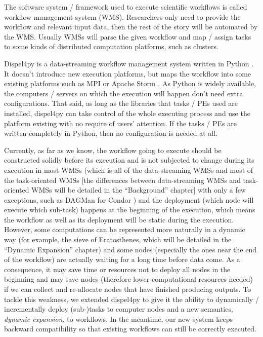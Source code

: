 The software system / framework used to execute scientific workflows is called workflow management system (WMS). Researchers only need to provide the workflow and relevant input data, then the rest of the story will be automated by the WMS. Usually WMSs will parse the given workflow and map / assign tasks to some kinds of distributed computation platforms, such as clusters.

Dispel4py is a data-streaming workflow management system written in Python \cite{doi:10.1177/1094342016649766}. It doesn't introduce new execution platforms, but maps the workflow into some existing platforms such as MPI \cite{MPI_forum} or Apache Storm \cite{apache_storm}. As Python is widely available, the computers / servers on which the execution will happen don't need extra configurations. That said, as long as the libraries that tasks / PEs used are installed, dispel4py can take control of the whole executing process and use the platform existing with no require of users' attention. If the tasks / PEs are written completely in Python, then no configuration is needed at all.

Currently, as far as we know, the workflow going to execute should be constructed solidly before its execution and is not subjected to change during its execution in most WMSs (which is all of the data-streaming WMSs and most of the task-oriented WMSs [the differences between data-streaming WMSs and task-oriented WMSs will be detailed in the ``Background'' chapter] with only a few exceptions, such as DAGMan for Condor \cite{couvares2007workflow}) and the deployment (\ie which node will execute which sub-task) happens at the beginning of the execution, which means the workflow as well as its deployment will be static during the execution. However, some computations can be represented more naturally in a dynamic way (for example, the sieve of Eratosthenes, which will be detailed in the ``Dynamic Expansion'' chapter) and some nodes (especially the ones near the end of the workflow) are actually waiting for a long time before data come. As a consequence, it may save time or resources not to deploy all nodes in the beginning and may save nodes (therefore lower computational resources needed) if we can collect and re-allocate nodes that have finished producing outputs. To tackle this weakness, we extended dispel4py to give it the ability to dynamically / incrementally deploy (sub-)tasks to computer nodes and a new semantics, \emph{dynamic expansion}, to workflows. In the meantime, our new system keeps backward compatibility so that existing workflows can still be correctly executed.

